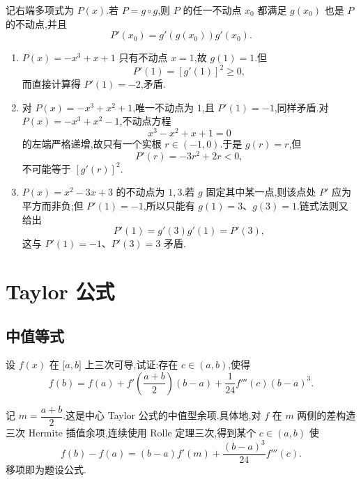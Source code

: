 \begin{solution}
    记右端多项式为 $P(x)$.若 $P=g\circ g$,则 $P$ 的任一不动点 $x_0$ 都满足 $g(x_0)$ 也是 $P$ 的不动点,并且
    \[
        P'(x_0)=g'(g(x_0))g'(x_0).
    \]

    \begin{enumerate}
        \item $P(x)=-x^3+x+1$ 只有不动点 $x=1$,故 $g(1)=1$.但
              \[
                  P'(1)=[g'(1)]^2\geq0,
              \]
              而直接计算得 $P'(1)=-2$,矛盾.

        \item 对 $P(x)=-x^3+x^2+1$,唯一不动点为 $1$,且 $P'(1)=-1$,同样矛盾.对 $P(x)=-x^3+x^2-1$,不动点方程
              \[
                  x^3-x^2+x+1=0
              \]
              的左端严格递增,故只有一个实根 $r\in(-1,0)$.于是 $g(r)=r$,但
              \[
                  P'(r)=-3r^2+2r<0,
              \]
              不可能等于 $[g'(r)]^2$.

        \item $P(x)=x^2-3x+3$ 的不动点为 $1,3$.若 $g$ 固定其中某一点,则该点处 $P'$ 应为平方而非负;但 $P'(1)=-1$,所以只能有 $g(1)=3$、$g(3)=1$.链式法则又给出
              \[
                  P'(1)=g'(3)g'(1)=P'(3),
              \]
              这与 $P'(1)=-1$、$P'(3)=3$ 矛盾.
    \end{enumerate}
\end{solution}


\newpage

\section{Taylor 公式}


\subsection{中值等式}

\begin{example}
    设 $f(x)$ 在 $\lbrack a,b\rbrack$ 上三次可导,试证:存在 $c\in(a,b)$,使得
    \[
        f(b)=f(a)+f'\left(\dfrac{a+b}{2}\right)(b-a)
        +\dfrac{1}{24}f'''(c)(b-a)^3.
    \]
\end{example}
\exampleblank

\begin{solution}
    记 $m=\dfrac{a+b}{2}$.这是中心 Taylor 公式的中值型余项.具体地,对 $f$ 在 $m$ 两侧的差构造三次 Hermite 插值余项,连续使用 Rolle 定理三次,得到某个 $c\in(a,b)$ 使
    \[
        f(b)-f(a)
        =(b-a)f'(m)+\dfrac{(b-a)^3}{24}f'''(c).
    \]
    移项即为题设公式.
\end{solution}

